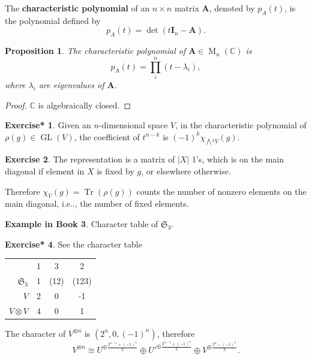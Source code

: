 \documentclass[12pt, letterpaper]{article}
\makeatletter
\newcommand{\co}{\mathbb{C}}
\newcommand{\GL}{\operatorname{GL}}
\newcommand{\MM}{\operatorname{M}}
\newcommand{\Tr}{\operatorname{Tr}}
\newcommand{\ext}[1]{\bigwedge\!^{#1}}
\newcommand{\idm}{\mathbf{I}}
\newcommand{\bfA}{\mathbf{A}}
\newcommand\ie{i.e\@ifnextchar.{}{.\@}}
\newcommand{\card}[1]{\left\lvert #1 \right\rvert}
\newtheorem{prop}{Proposition}[section]
\theoremstyle{definition}
\theoremstyle{remark}
\theoremstyle{definition}
\newtheorem{exe}{Exercise}[section]
\newtheorem{exe*}[exe]{Exercise*}
\newtheorem{exam}[exe]{Example in Book}
\theoremstyle{plain}
\numberwithin{equation}{section}
\makeatother
\begin{document}
	\begin{def*}
		The \textbf{characteristic polynomial}
		of an $n\times n$ matrix $\bfA$, denoted by $p_A(t)$, is the polynomial defined by
		\[p_A(t)=\det(t\idm_n-\bfA).\]		
	\end{def*}
	\begin{prop}
		The characteristic polynomial of $\bfA \in \MM_n(\co)$
		is
		\[p_A(t)=\prod_i^n(t-\lambda_i),\]
		where $\lambda_i$ are eigenvalues of $\bfA$.
	\end{prop}
	\begin{proof}
		$\co$ is algebraically closed.
	\end{proof}
	\begin{exe*}
		Given an $n$-dimensional space $V$,
		in the characteristic polynomial
		of $\rho(g)\in \GL(V)$,
		the coefficient of $t^{n-k}$ is $(-1)^k\chi_{\ext{k}V}(g)$.
	\end{exe*}
	\begin{exe}\label{exeCharPerm}
		The representation is a matrix of $\card{X}$ 1's,
		which is on the main diagonal if element in $X$ is fixed by $g$,
		or elsewhere otherwise.
		
		Therefore $\chi_V(g)=\Tr(\rho(g))$
		counts the number of nonzero elements on the main diagonal,
		\ie, the number of fixed elements.
	\end{exe}

	\begin{exam}
		Character table of $\mathfrak{S}_3$.
	\end{exam}

	\begin{exe*}
		
		See the character table
		
		\begin{center}
			\begin{tabular}{r | c c c}
				&1&3&2\\
				$\mathfrak{S}_3$&1&(12)&(123)\\
				\hline
				$V$&2&0&-1\\
				$V\otimes V$&4&0&1\\
			\end{tabular}
		\end{center}
		
		The character of $V^{\otimes n}$ is $(2^n,0,(-1)^n)$,
		therefore
		\[V^{\otimes n}\cong U^{\oplus \frac{2^{n-1}+(-1)^n}{3}}\oplus U'^{\oplus \frac{2^{n-1}+(-1)^n}{3}}\oplus V^{\oplus \frac{2^n-(-1)^n}{3}}.\]
	\end{exe*}
\end{document}
